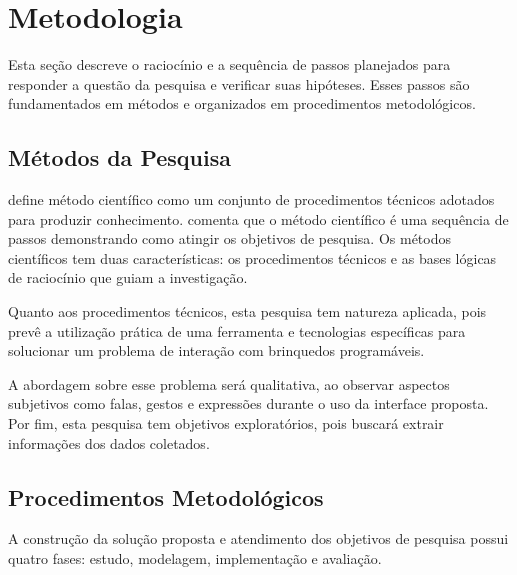 \section{Metodologia}
\label{s_cintro_metodologia}

Esta seção descreve o raciocínio e a sequência de passos planejados para responder a questão da pesquisa e verificar suas hipóteses. Esses passos são fundamentados em métodos e organizados em procedimentos metodológicos.


\subsection{Métodos da Pesquisa}
\label{ss_cintro_metod_pesquisa}

 define método científico como um conjunto de procedimentos técnicos adotados para produzir conhecimento.  comenta que o método científico é uma sequência de passos demonstrando como atingir os objetivos de pesquisa. Os métodos científicos tem duas características: os procedimentos técnicos e as bases lógicas de raciocínio que guiam a investigação.

Quanto aos procedimentos técnicos, esta pesquisa tem natureza aplicada, pois prevê a utilização prática de uma ferramenta e tecnologias específicas para solucionar um problema de interação com brinquedos programáveis.

A abordagem sobre esse problema será qualitativa, ao observar aspectos subjetivos como falas, gestos e expressões durante o uso da interface proposta. Por fim, esta pesquisa tem objetivos exploratórios, pois buscará extrair informações dos dados coletados.

\subsection{Procedimentos Metodológicos}
\label{ss_cintro_proced_metodologicos}

A construção da solução proposta e atendimento dos objetivos de pesquisa possui quatro fases: estudo, modelagem, implementação e avaliação.

